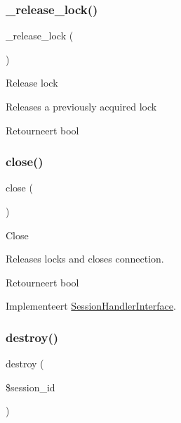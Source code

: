 \subsubsection{\texorpdfstring{\_release\_lock()}{\_release\_lock()}}
{\footnotesize\ttfamily \+\_\+release\+\_\+lock (\begin{DoxyParamCaption}{ }\end{DoxyParamCaption})\hspace{0.3cm}{\ttfamily [protected]}}

Release lock

Releases a previously acquired lock

\begin{DoxyReturn}{Retourneert}
bool 
\end{DoxyReturn}
\mbox{\label{class_c_i___session__memcached__driver_aa69c8bf1f1dcf4e72552efff1fe3e87e}} 
\subsubsection{\texorpdfstring{close()}{close()}}
{\footnotesize\ttfamily close (\begin{DoxyParamCaption}{ }\end{DoxyParamCaption})}

Close

Releases locks and closes connection.

\begin{DoxyReturn}{Retourneert}
bool 
\end{DoxyReturn}


Implementeert \mbox{\hyperlink{interface_session_handler_interface}{Session\+Handler\+Interface}}.

\mbox{\label{class_c_i___session__memcached__driver_aaec5812f6b4eb6835f88d3baa06a002a}} 
\subsubsection{\texorpdfstring{destroy()}{destroy()}}
{\footnotesize\ttfamily destroy (\begin{DoxyParamCaption}\item[{}]{\$session\+\_\+id }\end{DoxyParamCaption})}

